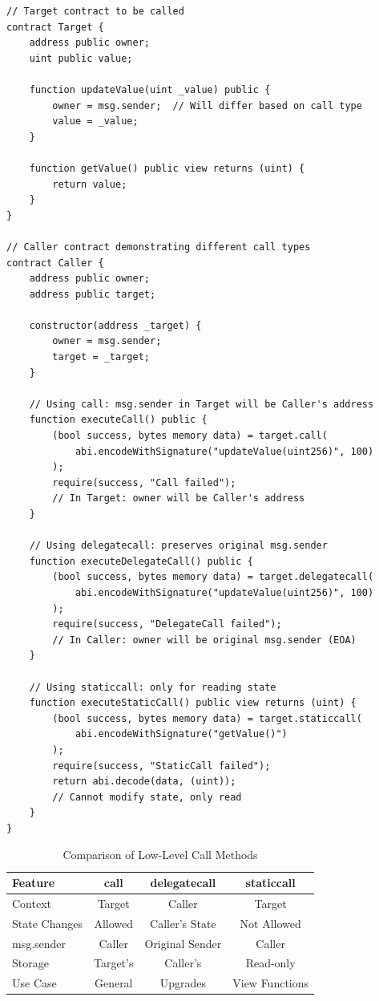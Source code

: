 \documentclass[conference]{IEEEtran}
\begin{document}
\begin{lstlisting}[style=solidity]
// Target contract to be called
contract Target {
    address public owner;
    uint public value;
    
    function updateValue(uint _value) public {
        owner = msg.sender;  // Will differ based on call type
        value = _value;
    }
    
    function getValue() public view returns (uint) {
        return value;
    }
}

// Caller contract demonstrating different call types
contract Caller {
    address public owner;
    address public target;
    
    constructor(address _target) {
        owner = msg.sender;
        target = _target;
    }
    
    // Using call: msg.sender in Target will be Caller's address
    function executeCall() public {
        (bool success, bytes memory data) = target.call(
            abi.encodeWithSignature("updateValue(uint256)", 100)
        );
        require(success, "Call failed");
        // In Target: owner will be Caller's address
    }
    
    // Using delegatecall: preserves original msg.sender
    function executeDelegateCall() public {
        (bool success, bytes memory data) = target.delegatecall(
            abi.encodeWithSignature("updateValue(uint256)", 100)
        );
        require(success, "DelegateCall failed");
        // In Caller: owner will be original msg.sender (EOA)
    }
    
    // Using staticcall: only for reading state
    function executeStaticCall() public view returns (uint) {
        (bool success, bytes memory data) = target.staticcall(
            abi.encodeWithSignature("getValue()")
        );
        require(success, "StaticCall failed");
        return abi.decode(data, (uint));
        // Cannot modify state, only read
    }
}
\end{lstlisting}

\begin{table}[h]
\renewcommand{\arraystretch}{1.2}
\small
\centering
\caption{Comparison of Low-Level Call Methods}
\begin{tabular}{|l|c|c|c|}
\hline
\textbf{Feature} & \textbf{call} & \textbf{delegatecall} & \textbf{staticcall} \\
\hline
Context & Target & Caller & Target \\
\hline
State Changes & Allowed & Caller's State & Not Allowed \\
\hline
msg.sender & Caller & Original Sender & Caller \\
\hline
Storage & Target's & Caller's & Read-only \\
\hline
Use Case & General & Upgrades & View Functions \\
\hline
\end{tabular}
\label{tab:call-comparison}
\end{table}
\end{document}
